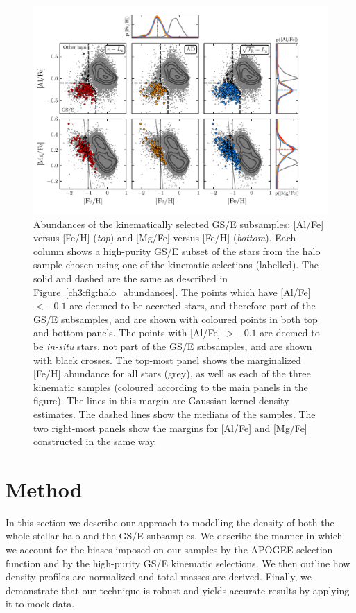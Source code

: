 \begin{figure}
    \centering
    \includegraphics[width=\textwidth]{figure/ch3/kinematic_sample_abundances.pdf}
    \caption{Abundances of the kinematically selected GS/E subsamples: [Al/Fe] versus [Fe/H] (\textit{top}) and [Mg/Fe] versus [Fe/H] (\textit{bottom}). Each column shows a high-purity GS/E subset of the stars from the halo sample chosen using one of the kinematic selections (labelled). The solid and dashed are the same as described in Figure~\ref{ch3:fig:halo_abundances}. The points which have [Al/Fe] $< -0.1$ are deemed to be accreted stars, and therefore part of the GS/E subsamples, and are shown with coloured points in both top and bottom panels. The points with [Al/Fe] $> -0.1$ are deemed to be \textit{in-situ} stars, not part of the GS/E subsamples, and are shown with black crosses. The top-most panel shows the marginalized [Fe/H] abundance for all stars (grey), as well as each of the three kinematic samples (coloured according to the main panels in the figure). The lines in this margin are Gaussian kernel density estimates. The dashed lines show the medians of the samples. The two right-most panels show the margins for [Al/Fe] and [Mg/Fe] constructed in the same way.}
    \label{ch3:fig:selection_abundances}
\end{figure}

\section{Method}
\label{ch3:sec:method}

In this section we describe our approach to modelling the density of both the whole stellar halo and the GS/E subsamples. We describe the manner in which we account for the biases imposed on our samples by the APOGEE selection function and by the high-purity GS/E kinematic selections. We then outline how density profiles are normalized and total masses are derived. Finally, we demonstrate that our technique is robust and yields accurate results by applying it to mock data.

